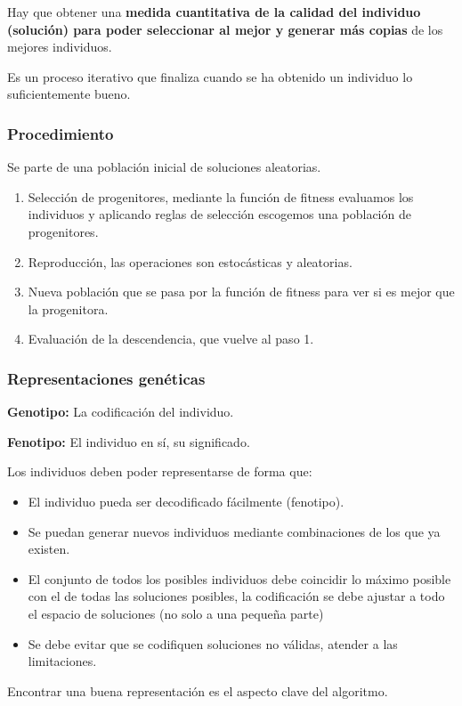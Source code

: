 \documentclass[12pt, twoside, openright]{report} %
\begin{document}
Hay que obtener una \textbf{medida cuantitativa de la calidad del individuo (solución) para poder seleccionar al mejor y generar más copias} de los mejores individuos.

Es un proceso iterativo que finaliza cuando se ha obtenido un individuo lo suficientemente bueno.

\subsubsection{Procedimiento}
Se parte de una población inicial de soluciones aleatorias.
\begin{enumerate}
	\item Selección de progenitores, mediante la función de fitness evaluamos los individuos y aplicando reglas de selección escogemos una población de progenitores.
	\item Reproducción, las operaciones son estocásticas y aleatorias.
	\item Nueva población que se pasa por la función de fitness para ver si es mejor que la progenitora.
	\item Evaluación de la descendencia, que vuelve al paso 1.
\end{enumerate}

\subsubsection{Representaciones genéticas}
\textbf{Genotipo:} La codificación del individuo.

\textbf{Fenotipo:} El individuo en sí, su significado.
\pagebreak

Los individuos deben poder representarse de forma que:
\begin{itemize}
	\item El individuo pueda ser decodificado fácilmente (fenotipo).
	\item Se puedan generar nuevos individuos mediante combinaciones de los que ya existen.
	\item El conjunto de todos los posibles individuos debe coincidir lo máximo posible con el de todas las soluciones posibles, la codificación se debe ajustar a todo el espacio de soluciones (no solo a una pequeña parte)
	\item Se debe evitar que se codifiquen soluciones no válidas, atender a las limitaciones.
\end{itemize}
Encontrar una buena representación es el aspecto clave del algoritmo.
\end{document}
